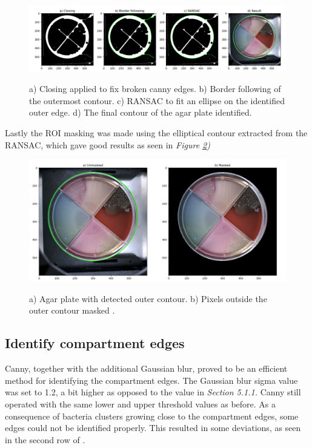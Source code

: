 \begin{figure}[H]
    \centering
     \includegraphics[width=1\linewidth]{figures/PDF/Ransac.pdf}\\
    \caption{a) Closing applied to fix broken canny edges. b) Border following of the outermost contour. c) RANSAC to fit an ellipse on the identified outer edge. d) The final contour of the agar plate identified.}
    \label{fig:result ransac}
\end{figure}

\noindent Lastly the ROI masking was made using the elliptical contour extracted from the RANSAC, which gave good results as seen in \textit{Figure \ref{fig:result mask})}
\begin{figure}[htbp]
    \centering
      \includegraphics[width=.85\linewidth]{figures/PDF/Mask.pdf}\\
    \caption{a) Agar plate with detected outer contour. b) Pixels outside the outer contour masked . }
    \label{fig:result mask}
\end{figure}


\subsection{Identify compartment edges}
Canny, together with the additional Gaussian blur, proved to be an efficient method for identifying the compartment edges. The Gaussian blur sigma value was set to 1.2, a bit higher as opposed to the value in \textit{Section 5.1.1.} Canny still operated with the same lower and upper threshold values as before. As a consequence of bacteria clusters growing close to the compartment edges, some edges could not be identified properly. This resulted in some deviations, as seen in the second row of .\\

